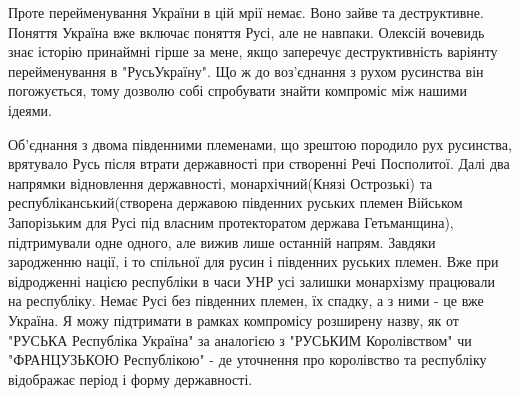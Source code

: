 Проте перейменування України в цій мрії немає. Воно зайве та деструктивне.
Поняття Україна вже включає поняття Русі, але не навпаки. Олексій вочевидь знає
історію принаймні гірше за мене, якщо заперечує деструктивність варіянту
перейменування в "РусьУкраїну". Що ж до воз'єднання з рухом русинства він
погожується, тому дозволю собі спробувати знайти компроміс між нашими ідеями.

Об'єднання з двома південними племенами, що зрештою породило рух русинства,
врятувало Русь після втрати державності при створенні Речі Посполитої. Далі два
напрямки відновлення державності, монархічний(Князі Острозькі) та
республіканський(створена державою південних руських племен Військом
Запорізьким для Русі під власним протекторатом держава Гетьманщина),
підтримували одне одного, але вижив лише останній напрям. Завдяки зародженню
нації, і то спільної для русин і південних руських племен. Вже при відродженні
нацією республіки в часи УНР усі залишки монархізму працювали на республіку.
Немає Русі без південних племен, їх спадку, а з ними - це вже Україна. Я можу
підтримати в рамках компромісу розширену назву, як от "РУСЬКА Республіка
Україна" за аналогією з "РУСЬКИМ Королівством" чи "ФРАНЦУЗЬКОЮ Республікою" -
де уточнення про королівство та республіку відображає період і форму
державності.
